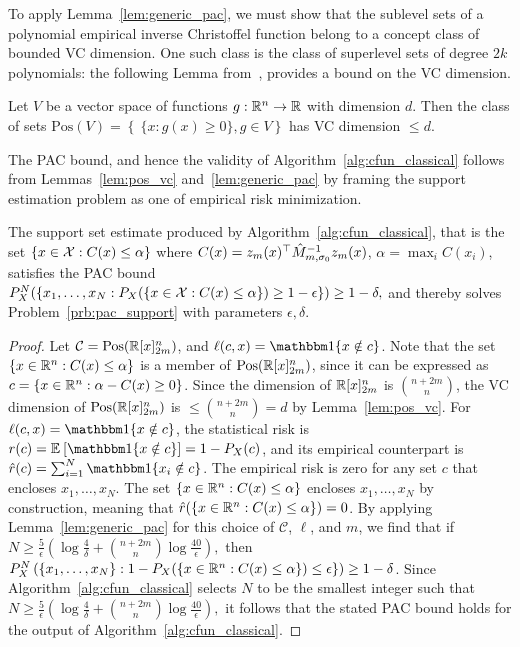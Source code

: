 \documentclass[onefignum,onetabnum]{siamart171218}
\begin{document}
To apply Lemma~\ref{lem:generic_pac}, we must show that the sublevel sets of a
polynomial empirical inverse Christoffel function belong to a concept class
of bounded VC dimension. 
One such class is the class of superlevel sets of degree $2k$ polynomials: the
following Lemma from~\cite{dudley1978central}, provides a bound on the
VC dimension. 

\begin{lemma}
    \label{lem:pos_vc}
    Let $V$ be a vector space of functions $g:\mathbb{R}^n\to\mathbb{R}$ with dimension $d$.
    Then the class of sets
        $
        \text{Pos}(V) = \left\{\ \{x : g(x)\ge 0\}, g\in V\right\}
        $
    has VC dimension $\le d$.
\end{lemma}

The PAC bound, and hence the validity of Algorithm~\ref{alg:cfun_classical}
follows from Lemmas~\ref{lem:pos_vc} and~\ref{lem:generic_pac} by framing the
support estimation problem as one of empirical risk minimization.
\begin{theorem}
    \label{thm:cfun_pac}
    The support set estimate produced by Algorithm~\ref{alg:cfun_classical},
    that is the set $\{x\in\mathcal{X}: C(x) \le \alpha\}$
    where $C(x)=z_m(x)^\top\hat{M}_{m,\sigma_0}^{-1}z_m(x)$,
    $\alpha=\max_i C(x_i)$,
    satisfies the PAC bound
        $
        P_X^N(\{x_1,\dotsc,x_N:P_X(\{x\in\mathcal{X}: C(x) \le \alpha\}) \ge
        1-\epsilon\})\ge 1-\delta,
        $
    and thereby solves Problem~\ref{prb:pac_support} with parameters
    $\epsilon,\delta$.
\end{theorem}

\begin{proof}
Let
$\mathcal{C}=\text{Pos}(\mathbb{R}[x]_{2m}^n)$,
and 
$\ell(c,x)=\ind{x\notin c}$.
Note that the set 
$\{x\in\mathbb{R}^n : C(x) \le \alpha\}$ 
is a member of
$\text{Pos}(\mathbb{R}[x]_{2m}^n)$, 
since it can be expressed as 
$c=\{x\in\mathbb{R}^n : \alpha - C(x) \ge 0\}$.
Since the dimension of $\mathbb{R}[x]_{2m}^n$ is $\binom{n+2m}{n}$, the
VC dimension of 
$\text{Pos}(\mathbb{R}[x]_{2m}^n)$ 
is $\le\binom{n+2m}{n}=d$ by Lemma~\ref{lem:pos_vc}. 
For 
$\ell(c,x)=\ind{x\notin c}$,
the statistical risk is 
$r(c)=\Ex{\ind{x\notin c}}=1-P_X(c)$,
and its empirical counterpart is
$\hat{r}(c)=\sum_{i=1}^N \ind{x_i\notin c}$.
The empirical risk is zero for any set $c$ that encloses 
$x_1,\dotsc,x_N$. The set 
$\{x\in\mathbb{R}^n : C(x) \le \alpha\}$ 
encloses 
$x_1,\dotsc,x_N$ 
by construction, meaning that 
$\hat{r}(\{x\in\mathbb{R}^n : C(x) \le \alpha\})=0$.
By applying Lemma~\ref{lem:generic_pac} for this choice of $\mathcal{C}$,
$\ell$, and $m$, we find that if
$
N \ge
    \frac{5}{\epsilon}\left(
    \log\frac{4}{\delta} + \binom{n+2m}{n} \log\frac{40}{\epsilon}
\right),
$
then
$P_X^N\left(\{x_1,\dotsc,x_N\} : 1-P_X(\{x\in\mathbb{R}^n : C(x) \le \alpha\}) \le \epsilon\}\right) \ge 1-\delta$.
Since Algorithm~\ref{alg:cfun_classical} selects $N$ to be the smallest integer
such that
$
N \ge
    \frac{5}{\epsilon}\left(
    \log\frac{4}{\delta} + \binom{n+2m}{n} \log\frac{40}{\epsilon}
\right),
$
it follows that the stated PAC bound holds for the output of
Algorithm~\ref{alg:cfun_classical}.
\end{proof}
\end{document}
